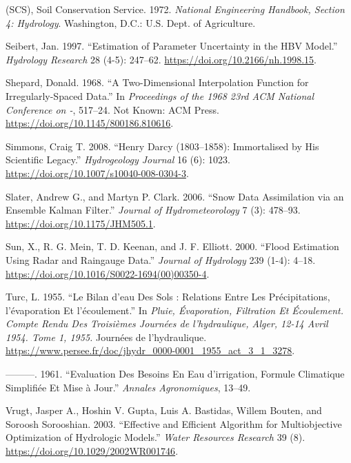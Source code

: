 \documentclass[
  letterpaper,
  DIV=11,
  numbers=noendperiod]{scrreprt}
\newlength{\cslhangindent}
\newlength{\cslentryspacingunit} %
\newenvironment{CSLReferences}[2] %
 {%
  \setlength{\parindent}{0pt}
  \ifodd #1
  \let\oldpar\par
  \def\par{\hangindent=\cslhangindent\oldpar}
  \fi
  \setlength{\parskip}{#2\cslentryspacingunit}
 }%
 {}
\begin{document}
\begin{CSLReferences}{1}{0}
\leavevmode{}%
(SCS), Soil Conservation Service. 1972. \emph{National {Engineering}
{Handbook}, {Section} 4: {Hydrology}}. Washington, D.C.: U.S. Dept. of
Agriculture.

\leavevmode{}%
Seibert, Jan. 1997. {``Estimation of {Parameter} {Uncertainty} in the
{HBV} {Model}.''} \emph{Hydrology Research} 28 (4-5): 247--62.
\url{https://doi.org/10.2166/nh.1998.15}.

\leavevmode{}%
Shepard, Donald. 1968. {``A Two-Dimensional Interpolation Function for
Irregularly-Spaced Data.''} In \emph{Proceedings of the 1968 23rd {ACM}
National Conference on -}, 517--24. Not Known: ACM Press.
\url{https://doi.org/10.1145/800186.810616}.

\leavevmode{}%
Simmons, Craig T. 2008. {``Henry {Darcy} (1803--1858): {Immortalised} by
His Scientific Legacy.''} \emph{Hydrogeology Journal} 16 (6): 1023.
\url{https://doi.org/10.1007/s10040-008-0304-3}.

\leavevmode{}%
Slater, Andrew G., and Martyn P. Clark. 2006. {``Snow {Data}
{Assimilation} via an {Ensemble} {Kalman} {Filter}.''} \emph{Journal of
Hydrometeorology} 7 (3): 478--93.
\url{https://doi.org/10.1175/JHM505.1}.

\leavevmode{}%
Sun, X., R. G. Mein, T. D. Keenan, and J. F. Elliott. 2000. {``Flood
Estimation Using Radar and Raingauge Data.''} \emph{Journal of
Hydrology} 239 (1-4): 4--18.
\url{https://doi.org/10.1016/S0022-1694(00)00350-4}.

\leavevmode{}%
Turc, L. 1955. {``Le Bilan d'eau Des Sols : Relations Entre Les
Précipitations, l'évaporation Et l'écoulement.''} In \emph{Pluie,
Évaporation, Filtration Et Écoulement. {Compte} Rendu Des Troisièmes
Journées de l'hydraulique, {Alger}, 12-14 Avril 1954. {Tome} 1, 1955.}
Journées de l'hydraulique.
\url{https://www.persee.fr/doc/jhydr_0000-0001_1955_act_3_1_3278}.

\leavevmode{}%
---------. 1961. {``Evaluation Des Besoins En Eau d'irrigation, Formule
Climatique Simplifiée Et Mise à Jour.''} \emph{Annales Agronomiques},
13--49.

\leavevmode{}%
Vrugt, Jasper A., Hoshin V. Gupta, Luis A. Bastidas, Willem Bouten, and
Soroosh Sorooshian. 2003. {``Effective and Efficient Algorithm for
Multiobjective Optimization of Hydrologic Models.''} \emph{Water
Resources Research} 39 (8). \url{https://doi.org/10.1029/2002WR001746}.


\end{CSLReferences}
\end{document}
